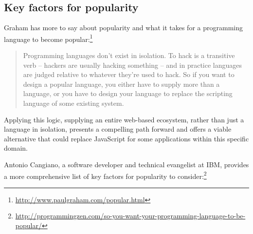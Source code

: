 \subsection{Key factors for popularity}

Graham has more to say about popularity and what it takes for a programming language to become popular:\footnote{\url{http://www.paulgraham.com/popular.html}}

\begin{quote}
Programming languages don't exist in isolation. To hack is a transitive verb -- hackers are usually hacking something -- and in practice languages are judged relative to whatever they're used to hack. So if you want to design a popular language, you either have to supply more than a language, or you have to design your language to replace the scripting language of some existing system. 
\end{quote}

\noindent Applying this logic, supplying an entire web-based ecosystem, rather than just a language in isolation, presents a compelling path forward and offers a viable alternative that could replace JavaScript for some applications within this specific domain.

Antonio Cangiano, a software developer and technical evangelist at IBM, provides a more comprehensive list of key factors for popularity to consider:\footnote{\url{http://programmingzen.com/so-you-want-your-programming-language-to-be-popular/}}

